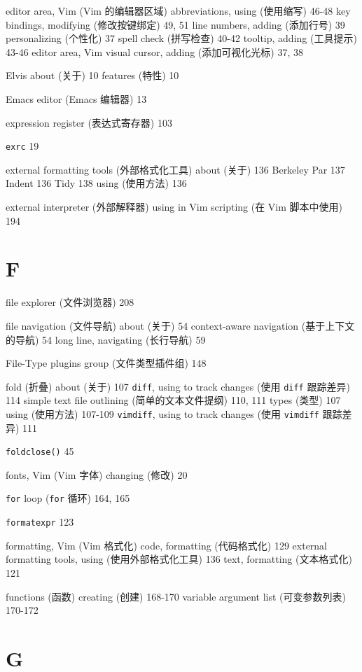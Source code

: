 editor area, Vim (Vim 的编辑器区域)
  abbreviations, using (使用缩写) 46-48
  key bindings, modifying (修改按键绑定) 49, 51
  line numbers, adding (添加行号) 39
  personalizing (个性化) 37
  spell check (拼写检查) 40-42
  tooltip, adding (工具提示) 43-46
  editor area, Vim visual cursor, adding (添加可视化光标) 37, 38

Elvis
  about (关于) 10
  features (特性) 10

Emacs editor (Emacs 编辑器) 13

expression register (表达式寄存器) 103

\texttt{exrc} 19

external formatting tools (外部格式化工具)
  about (关于) 136
  Berkeley Par 137
  Indent 136
  Tidy 138
  using (使用方法) 136

external interpreter (外部解释器)
  using in Vim scripting (在 Vim 脚本中使用) 194

\section{F}

file explorer (文件浏览器) 208

file navigation (文件导航)
  about (关于) 54
  context-aware navigation (基于上下文的导航) 54
  long line, navigating (长行导航) 59

File-Type plugins group (文件类型插件组) 148

fold (折叠)
  about (关于) 107
  \texttt{diff}, using to track changes (使用 \texttt{diff} 跟踪差异) 114
  simple text file outlining (简单的文本文件提纲) 110, 111
  types (类型) 107
  using (使用方法) 107-109
  \texttt{vimdiff}, using to track changes (使用 \texttt{vimdiff} 跟踪差异) 111

\texttt{foldclose()} 45

fonts, Vim (Vim 字体)
  changing (修改) 20

\texttt{for} loop (\texttt{for} 循环) 164, 165

\texttt{formatexpr} 123

formatting, Vim (Vim 格式化)
  code, formatting (代码格式化) 129
  external formatting tools, using (使用外部格式化工具) 136
  text, formatting (文本格式化) 121

functions (函数)
  creating (创建) 168-170
  variable argument list (可变参数列表) 170-172

\section{G}

